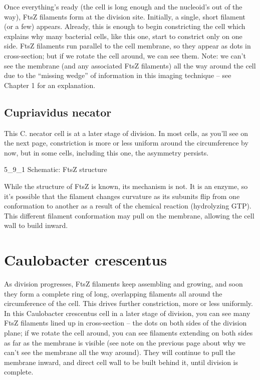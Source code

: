 \documentclass[]{tufte-book}
\begin{document}
Once everything's ready (the cell is long enough and the nucleoid's out
of the way), FtsZ filaments form at the division site. Initially, a
single, short filament (or a few) appears. Already, this is enough to
begin constricting the cell which explains why many bacterial cells,
like this one, start to constrict only on one side. FtsZ filaments run
parallel to the cell membrane, so they appear as dots in cross-section;
but if we rotate the cell around, we can see them. Note: we can't see
the membrane (and any associated FtsZ filaments) all the way around the
cell due to the ``missing wedge'' of information in this imaging
technique -- see Chapter 1 for an explanation.

\subsection{Cupriavidus necator}\label{Asymmetric_constriction}

This C. necator cell is at a later stage of division. In most cells, as
you'll see on the next page, constriction is more or less uniform around
the circumference by now, but in some cells, including this one, the
asymmetry persists.

5\_9\_1 Schematic: FtsZ structure

While the structure of FtsZ is known, its mechanism is not. It is an
enzyme, so it's possible that the filament changes curvature as its
subunits flip from one conformation to another as a result of the
chemical reaction (hydrolyzing GTP). This different filament
conformation may pull on the membrane, allowing the cell wall to build
inward.

\section{Caulobacter crescentus}\label{caulobacter-crescentus-5}

As division progresses, FtsZ filaments keep assembling and growing, and
soon they form a complete ring of long, overlapping filaments all around
the circumference of the cell. This drives further constriction, more or
less uniformly. In this Caulobacter crescentus cell in a later stage of
division, you can see many FtsZ filaments lined up in cross-section --
the dots on both sides of the division plane; if we rotate the cell
around, you can see filaments extending on both sides as far as the
membrane is visible (see note on the previous page about why we can't
see the membrane all the way around). They will continue to pull the
membrane inward, and direct cell wall to be built behind it, until
division is complete.
\end{document}
